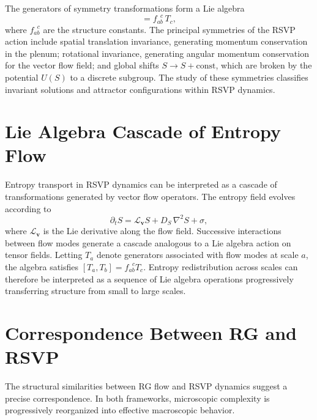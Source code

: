 \documentclass[12pt,a4paper]{article}
\theoremstyle{plain}
\theoremstyle{definition}
\theoremstyle{remark}
\begin{document}
The generators of symmetry transformations form a Lie algebra
\begin{equation}
[T_a, T_b] = f_{ab}^{\;\;c}\,T_c,
\end{equation}
where $f_{ab}^{\;\;c}$ are the structure constants. The principal
symmetries of the RSVP action include spatial translation invariance,
generating momentum conservation in the plenum; rotational invariance,
generating angular momentum conservation for the vector flow field;
and global shifts $S \to S + \text{const}$, which are broken by the
potential $U(S)$ to a discrete subgroup. The study of these symmetries
classifies invariant solutions and attractor configurations within
RSVP dynamics.

\section{Lie Algebra Cascade of Entropy Flow}

Entropy transport in RSVP dynamics can be interpreted as a cascade of
transformations generated by vector flow operators. The entropy field
evolves according to
\begin{equation}
\partial_t S = \mathcal{L}_{\mathbf{v}} S + D_S\,\nabla^2 S + \sigma,
\end{equation}
where $\mathcal{L}_{\mathbf{v}}$ is the Lie derivative along the flow
field. Successive interactions between flow modes generate a cascade
analogous to a Lie algebra action on tensor fields. Letting $T_a$
denote generators associated with flow modes at scale $a$, the
algebra satisfies $[T_a, T_b] = f_{ab}^{\;\;c} T_c$. Entropy
redistribution across scales can therefore be interpreted as a sequence
of Lie algebra operations progressively transferring structure from
small to large scales.

\section{Correspondence Between RG and RSVP}

The structural similarities between RG flow and RSVP dynamics suggest
a precise correspondence. In both frameworks, microscopic complexity
is progressively reorganized into effective macroscopic behavior.
\end{document}
